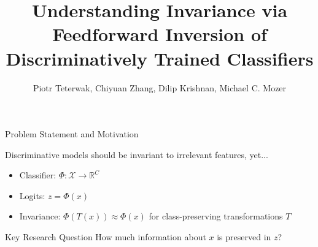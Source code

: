 \documentclass{beamer}
\title{Understanding Invariance via Feedforward Inversion of Discriminatively Trained Classifiers}
\author{Piotr Teterwak, Chiyuan Zhang, Dilip Krishnan, Michael C. Mozer}
\institute{Talk by Dmitry Vasilenko}
\date{}
\begin{document}
\begin{frame}
\titlepage
\end{frame}

\begin{frame}{Problem Statement and Motivation}

Discriminative models should be invariant to irrelevant features, yet...


\begin{itemize}
    \item Classifier: $\Phi: \mathcal{X} \rightarrow \mathbb{R}^{C}$
    \item Logits: $z = \Phi(x)$
    \item Invariance: $\Phi(T(x)) \approx \Phi(x)$ for class-preserving transformations $T$
\end{itemize}

\begin{alertblock}{Key Research Question}
How much information about $x$ is preserved in $z$?
\end{alertblock}
\end{frame}
\end{document}
